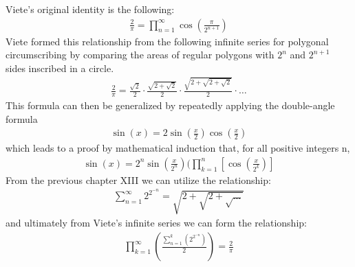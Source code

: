 \documentclass{article}
\begin{document}
Viete's original identity is the following:
\begin{align*}
\frac{2}{\pi} = \prod_{n=1}^{\infty} \cos\left(\frac{\pi}{2^{n+1}}\right)
\end{align*}
Viete formed this relationship from the following infinite series for polygonal circumscribing by comparing the areas of regular polygons with $2^{n}$ and $2^{n+1}$ sides inscribed in a circle.
\begin{align*}
\frac{2}{\pi} = \frac{\sqrt{2}}{2} \cdot \frac{\sqrt{2+\sqrt{2}}}{2} \cdot \frac{\sqrt{2+\sqrt{2+\sqrt{2}}}}{2} \cdot \ldots
\end{align*}
This formula can then be generalized by repeatedly applying the double-angle formula
\begin{align*}
\sin(x) = 2\sin(\frac{x}{2})\cos(\frac{x}{2})
\end{align*}
which leads to a proof by mathematical induction that, for all positive integers n,
\begin{align*}
\sin(x) = 2^{n}\sin(\frac{x}{2^{n}})(\prod_{k=1}^{n} [\cos(\frac{x}{2^{k}})]
\end{align*}
From the previous chapter XIII we can utilize the relationship:
\begin{align*}
\sum_{n=1}^{\infty} 2^{2^{-n}} = \sqrt{2 + \sqrt{2 + \sqrt{\ldots}}}
\end{align*}
and ultimately from Viete's infinite series we can form the relationship:
\begin{align*}
\prod_{k=1}^{\infty} (\frac{\sum_{n=1}^{k} (2^{2^{-n}})}{2}) = \frac{2}{\pi}
\end{align*}
\end{document}
